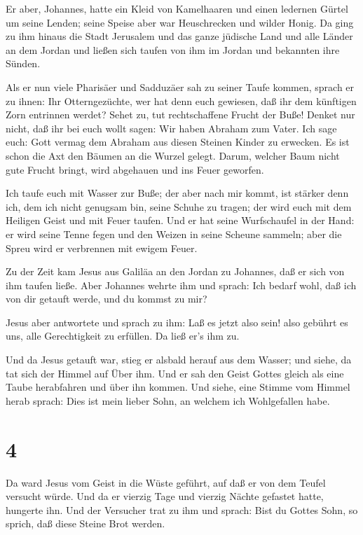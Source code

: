  Er aber, Johannes, hatte ein Kleid von Kamelhaaren und
einen ledernen Gürtel um seine Lenden; seine Speise aber war
Heuschrecken und wilder Honig.  Da ging zu ihm hinaus die
Stadt Jerusalem und das ganze jüdische Land und alle Länder an dem
Jordan  und ließen sich taufen von ihm im Jordan und
bekannten ihre Sünden.

 Als er nun viele Pharisäer und Sadduzäer sah zu seiner
Taufe kommen, sprach er zu ihnen: Ihr Otterngezüchte, wer hat denn euch
gewiesen, daß ihr dem künftigen Zorn entrinnen werdet? 
Sehet zu, tut rechtschaffene Frucht der Buße!  Denket nur
nicht, daß ihr bei euch wollt sagen: Wir haben Abraham zum Vater. Ich
sage euch: Gott vermag dem Abraham aus diesen Steinen Kinder zu
erwecken.  Es ist schon die Axt den Bäumen an die Wurzel
gelegt. Darum, welcher Baum nicht gute Frucht bringt, wird abgehauen und
ins Feuer geworfen.

 Ich taufe euch mit Wasser zur Buße; der aber nach mir
kommt, ist stärker denn ich, dem ich nicht genugsam bin, seine Schuhe zu
tragen; der wird euch mit dem Heiligen Geist und mit Feuer taufen.
 Und er hat seine Wurfschaufel in der Hand: er wird seine
Tenne fegen und den Weizen in seine Scheune sammeln; aber die Spreu wird
er verbrennen mit ewigem Feuer.

 Zu der Zeit kam Jesus aus Galiläa an den Jordan zu
Johannes, daß er sich von ihm taufen ließe.  Aber Johannes
wehrte ihm und sprach: Ich bedarf wohl, daß ich von dir getauft werde,
und du kommst zu mir?

 Jesus aber antwortete und sprach zu ihm: Laß es jetzt also
sein! also gebührt es uns, alle Gerechtigkeit zu erfüllen. Da ließ er's
ihm zu.

 Und da Jesus getauft war, stieg er alsbald herauf aus dem
Wasser; und siehe, da tat sich der Himmel auf Über ihm. Und er sah den
Geist Gottes gleich als eine Taube herabfahren und über ihn kommen.
 Und siehe, eine Stimme vom Himmel herab sprach: Dies ist
mein lieber Sohn, an welchem ich Wohlgefallen habe.

\hypertarget{section-3}{%
\section{4}\label{section-3}}

 Da ward Jesus vom Geist in die Wüste geführt, auf daß er
von dem Teufel versucht würde.  Und da er vierzig Tage und
vierzig Nächte gefastet hatte, hungerte ihn.  Und der
Versucher trat zu ihm und sprach: Bist du Gottes Sohn, so sprich, daß
diese Steine Brot werden.

